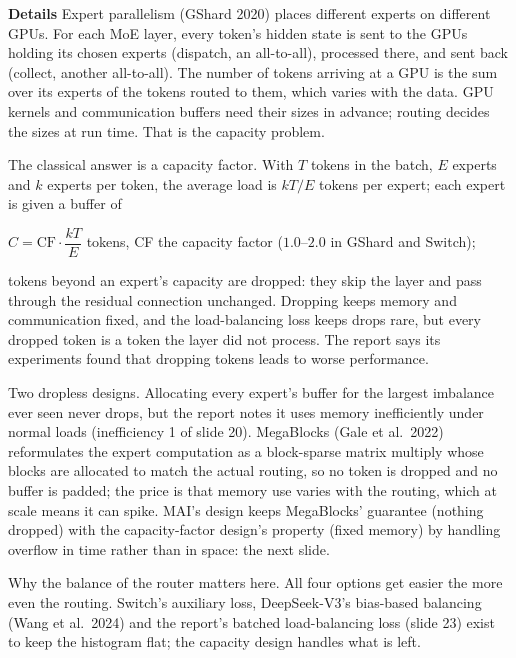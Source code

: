 \documentclass[11pt,letterpaper]{article}
\newcommand{\para}[1]{\medskip\noindent\textbf{#1}\quad}
\newenvironment{formulas}{\begin{tcolorbox}[formulabox]}{\end{tcolorbox}}
\begin{document}
\para{Details} Expert parallelism (GShard 2020) places different experts on different GPUs. For each MoE layer, every token's hidden state is sent to the GPUs holding its chosen experts (dispatch, an all-to-all), processed there, and sent back (collect, another all-to-all). The number of tokens arriving at a GPU is the sum over its experts of the tokens routed to them, which varies with the data. GPU kernels and communication buffers need their sizes in advance; routing decides the sizes at run time. That is the capacity problem.

The classical answer is a capacity factor. With $T$ tokens in the batch, $E$ experts and $k$ experts per token, the average load is $kT/E$ tokens per expert; each expert is given a buffer of
\begin{formulas}
$C=\text{CF}\cdot\dfrac{kT}{E}$ tokens, \qquad CF the capacity factor ($1.0$--$2.0$ in GShard and Switch);
\end{formulas}
tokens beyond an expert's capacity are dropped: they skip the layer and pass through the residual connection unchanged. Dropping keeps memory and communication fixed, and the load-balancing loss keeps drops rare, but every dropped token is a token the layer did not process. The report says its experiments found that dropping tokens leads to worse performance.

Two dropless designs. Allocating every expert's buffer for the largest imbalance ever seen never drops, but the report notes it uses memory inefficiently under normal loads (inefficiency 1 of slide 20). MegaBlocks (Gale et al.\ 2022) reformulates the expert computation as a block-sparse matrix multiply whose blocks are allocated to match the actual routing, so no token is dropped and no buffer is padded; the price is that memory use varies with the routing, which at scale means it can spike. MAI's design keeps MegaBlocks' guarantee (nothing dropped) with the capacity-factor design's property (fixed memory) by handling overflow in time rather than in space: the next slide.

Why the balance of the router matters here. All four options get easier the more even the routing. Switch's auxiliary loss, DeepSeek-V3's bias-based balancing (Wang et al.\ 2024) and the report's batched load-balancing loss (slide 23) exist to keep the histogram flat; the capacity design handles what is left.
\end{document}
